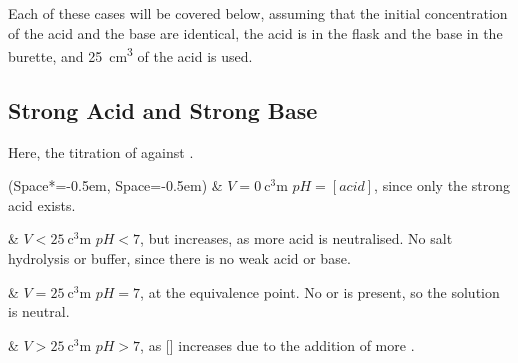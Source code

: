 			Each of these cases will be covered below, assuming that the initial concentration of the acid and the base are identical,
			the acid is in the flask and the base in the burette, and \SI{25}{\cubic\centi\metre} of the acid is used.


		\subsection{Strong Acid and Strong Base}

			Here, the titration of  against .

			\begin{center}
			\end{center}

			\begin{bulletlist}
				\ListProperties(Space*=-0.5em, Space=-0.5em)
				& $V = \SI{0}{\cubic\centi\metre}$
					\tabto{25mm}$pH = [acid]$, since only the strong acid exists.

				& $V < \SI{25}{\cubic\centi\metre}$
					\tabto{25mm}$pH < 7$, but increases, as more acid is neutralised.
					\tabto{25mm}No salt hydrolysis or buffer, since there is no weak acid or base.

				& $V = \SI{25}{\cubic\centi\metre}$
					\tabto{25mm}$pH = 7$, at the equivalence point.
					\tabto{25mm}No  or  is present, so the solution is neutral.

				& $V > \SI{25}{\cubic\centi\metre}$
					\tabto{25mm}$pH > 7$, as [] increases due to the addition of more .

			\end{bulletlist}

